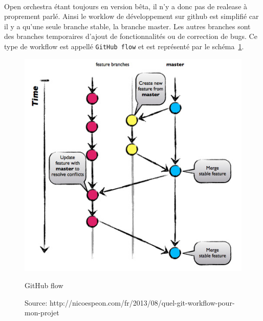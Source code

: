 \paragraph{}
Open orchestra étant toujours en version bêta, il n'y a donc pas de realease à proprement parlé. Ainsi le worklow de développement sur github est simplifié car il y a qu'une seule branche stable, la branche master. Les autres branches sont des branches temporaires d'ajout de fonctionnalités ou de correction de bugs. Ce type de workflow est appellé \verb?GitHub flow? et est représenté par le schéma~\ref{github}.
\begin{figure}[H]
  \begin{center}
    \includegraphics[scale=0.75]{images/github-flow}
  \end{center}
  \caption{GitHub flow}
  \caption*{Source: http://nicoespeon.com/fr/2013/08/quel-git-workflow-pour-mon-projet}
  \label{github}
\end{figure}

